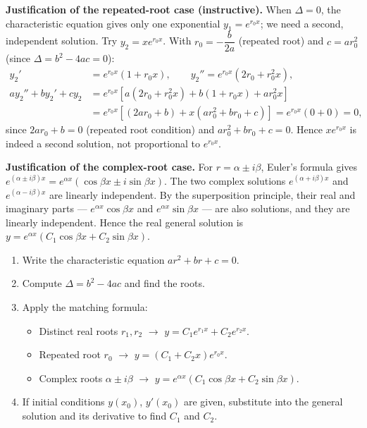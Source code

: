 \documentclass[11pt]{article}
\begin{document}
\textbf{Justification of the repeated-root case (instructive).} When $\Delta=0$, the characteristic equation gives only one exponential $y_{1}=e^{r_{0}x}$; we need a second, independent solution. Try $y_{2}=xe^{r_{0}x}$. With $r_{0}=-\dfrac{b}{2a}$ (repeated root) and $c=ar_{0}^{2}$ (since $\Delta=b^{2}-4ac=0$):
\begin{align*}
y_{2}'&=e^{r_{0}x}(1+r_{0}x), \qquad y_{2}''=e^{r_{0}x}(2r_{0}+r_{0}^{2}x),\\
ay_{2}''+by_{2}'+cy_{2}&=e^{r_{0}x}\left[a(2r_{0}+r_{0}^{2}x)+b(1+r_{0}x)+ar_{0}^{2}x\right]\\
&=e^{r_{0}x}\left[(2ar_{0}+b)+x(ar_{0}^{2}+br_{0}+c)\right]=e^{r_{0}x}(0+0)=0,
\end{align*}
since $2ar_{0}+b=0$ (repeated root condition) and $ar_{0}^{2}+br_{0}+c=0$. Hence $xe^{r_{0}x}$ is indeed a second solution, not proportional to $e^{r_{0}x}$.

\textbf{Justification of the complex-root case.} For $r=\alpha\pm i\beta$, Euler's formula gives $e^{(\alpha\pm i\beta)x}=e^{\alpha x}(\cos\beta x\pm i\sin\beta x)$. The two complex solutions $e^{(\alpha+i\beta)x}$ and $e^{(\alpha-i\beta)x}$ are linearly independent. By the superposition principle, their real and imaginary parts — $e^{\alpha x}\cos\beta x$ and $e^{\alpha x}\sin\beta x$ — are also solutions, and they are linearly independent. Hence the real general solution is $y=e^{\alpha x}(C_{1}\cos\beta x+C_{2}\sin\beta x)$.

\begin{methode}
\begin{enumerate}
\item Write the characteristic equation $ar^{2}+br+c=0$.
\item Compute $\Delta=b^{2}-4ac$ and find the roots.
\item Apply the matching formula:
\begin{itemize}
\item Distinct real roots $r_{1},r_{2}$ $\rightarrow$ $y=C_{1}e^{r_{1}x}+C_{2}e^{r_{2}x}$.
\item Repeated root $r_{0}$ $\rightarrow$ $y=(C_{1}+C_{2}x)e^{r_{0}x}$.
\item Complex roots $\alpha\pm i\beta$ $\rightarrow$ $y=e^{\alpha x}(C_{1}\cos\beta x+C_{2}\sin\beta x)$.
\end{itemize}
\item If initial conditions $y(x_{0})$, $y'(x_{0})$ are given, substitute into the general solution and its derivative to find $C_{1}$ and $C_{2}$.
\end{enumerate}
\end{methode}
\end{document}
